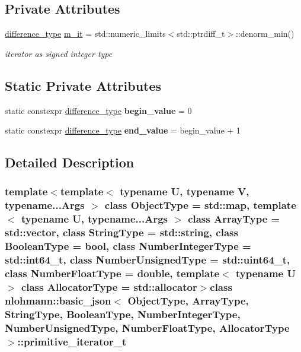 \subsection*{Private Attributes}
\begin{DoxyCompactItemize}
\item 
\hyperlink{classnlohmann_1_1basic__json_aec316934a555dd1acdd3600e5d4a4cdf}{difference\+\_\+type} \hyperlink{classnlohmann_1_1basic__json_1_1primitive__iterator__t_aed1a94e17ea6a32cc75baa55e239b002}{m\+\_\+it} = std\+::numeric\+\_\+limits$<$std\+::ptrdiff\+\_\+t$>$\+::denorm\+\_\+min()
\begin{DoxyCompactList}\small\item\em iterator as signed integer type \end{DoxyCompactList}\end{DoxyCompactItemize}
\subsection*{Static Private Attributes}
\begin{DoxyCompactItemize}
\item 
\hypertarget{classnlohmann_1_1basic__json_1_1primitive__iterator__t_ae79dfabea850815bbf51e9e9a4841e5c}{}static constexpr \hyperlink{classnlohmann_1_1basic__json_aec316934a555dd1acdd3600e5d4a4cdf}{difference\+\_\+type} {\bfseries begin\+\_\+value} = 0\label{classnlohmann_1_1basic__json_1_1primitive__iterator__t_ae79dfabea850815bbf51e9e9a4841e5c}

\item 
\hypertarget{classnlohmann_1_1basic__json_1_1primitive__iterator__t_ac36f28f0a0d90ce02d086b5b05e5c7f3}{}static constexpr \hyperlink{classnlohmann_1_1basic__json_aec316934a555dd1acdd3600e5d4a4cdf}{difference\+\_\+type} {\bfseries end\+\_\+value} = begin\+\_\+value + 1\label{classnlohmann_1_1basic__json_1_1primitive__iterator__t_ac36f28f0a0d90ce02d086b5b05e5c7f3}

\end{DoxyCompactItemize}


\subsection{Detailed Description}
\subsubsection*{template$<$template$<$ typename U, typename V, typename...\+Args $>$ class Object\+Type = std\+::map, template$<$ typename U, typename...\+Args $>$ class Array\+Type = std\+::vector, class String\+Type = std\+::string, class Boolean\+Type = bool, class Number\+Integer\+Type = std\+::int64\+\_\+t, class Number\+Unsigned\+Type = std\+::uint64\+\_\+t, class Number\+Float\+Type = double, template$<$ typename U $>$ class Allocator\+Type = std\+::allocator$>$class nlohmann\+::basic\+\_\+json$<$ Object\+Type, Array\+Type, String\+Type, Boolean\+Type, Number\+Integer\+Type, Number\+Unsigned\+Type, Number\+Float\+Type, Allocator\+Type $>$\+::primitive\+\_\+iterator\+\_\+t}

